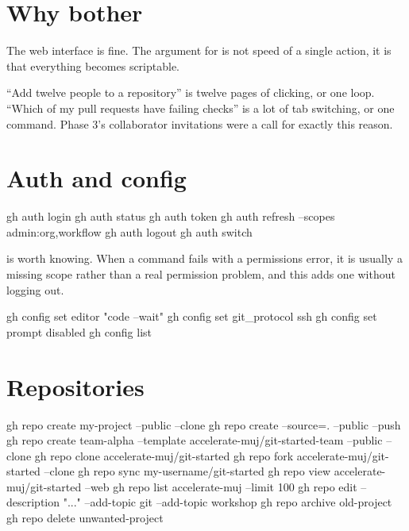 \documentclass[11pt]{article}
\begin{document}
\maketitlepage

\section{Why bother}

The web interface is fine. The argument for  is not speed of a single action,
it is that everything becomes scriptable.

``Add twelve people to a repository'' is twelve pages of clicking, or one loop.
``Which of my pull requests have failing checks'' is a lot of tab switching, or one
command. Phase 3's collaborator invitations were a  call for exactly this
reason.

\section{Auth and config}

\begin{shell}
gh auth login
gh auth status
gh auth token
gh auth refresh --scopes admin:org,workflow
gh auth logout
gh auth switch
\end{shell}

 is worth knowing. When a command fails with a permissions error,
it is usually a missing scope rather than a real permission problem, and this adds
one without logging out.

\begin{shell}
gh config set editor "code --wait"
gh config set git_protocol ssh
gh config set prompt disabled
gh config list
\end{shell}

\section{Repositories}

\begin{shell}
gh repo create my-project --public --clone
gh repo create --source=. --public --push
gh repo create team-alpha --template accelerate-muj/git-started-team --public --clone
gh repo clone accelerate-muj/git-started
gh repo fork accelerate-muj/git-started --clone
gh repo sync my-username/git-started
gh repo view accelerate-muj/git-started --web
gh repo list accelerate-muj --limit 100
gh repo edit --description "..." --add-topic git --add-topic workshop
gh repo archive old-project
gh repo delete unwanted-project
\end{shell}
\end{document}
